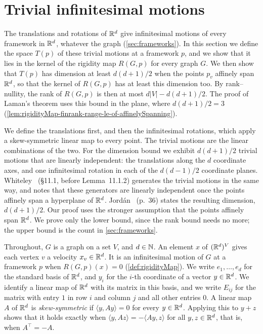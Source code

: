 \section{Trivial infinitesimal motions}
\label{sec:trivial-motions}

The translations and rotations of ${\mathbb{R}}^{d}$ give infinitesimal motions
of every framework in ${\mathbb{R}}^{d}$, whatever the graph
(\cref{sec:frameworks}). In this section we define the space $T(p)$ of
these trivial motions at a framework $p$, and we show that it lies in
the kernel of the rigidity map $R(G, p)$ for every graph $G$. We then
show that $T(p)$ has dimension at least $d(d+1)/2$ when the points
$p_v$ affinely span ${\mathbb{R}}^{d}$, so that the kernel of $R(G, p)$ has at
least this dimension too. By rank--nullity, the rank of $R(G, p)$ is
then at most $d|V| - d(d+1)/2$. The proof of Laman's theorem uses this
bound in the plane, where $d(d+1)/2 = 3$
(\cref{lem:rigidityMap-finrank-range-le-of-affinelySpanning}).

We define the translations first, and then the infinitesimal
rotations, which apply a skew-symmetric linear map to every point. The
trivial motions are the linear combinations of the two. For the
dimension bound we exhibit $d(d+1)/2$ trivial motions that are
linearly independent: the translations along the $d$ coordinate axes,
and one infinitesimal rotation in each of the $d(d-1)/2$ coordinate
planes. Whiteley~\cite{whiteley1996} (\S 11.1, before Lemma~11.1.2)
generates the trivial motions in the same way, and notes that these
generators are linearly independent once the points affinely span a
hyperplane of ${\mathbb{R}}^{d}$. Jord\'an~\cite{jordan2016} (p.~36) states the
resulting dimension, $d(d+1)/2$. Our proof uses the stronger
assumption that the points affinely span ${\mathbb{R}}^{d}$. We prove only the
lower bound, since the rank bound needs no more; the upper bound is
the count in \cref{sec:frameworks}.

Throughout, $G$ is a graph on a set $V$, and $d \in {\mathbb{N}}$. An element
$x$ of $({\mathbb{R}}^{d})^{V}$ gives each vertex $v$ a velocity
$x_v \in {\mathbb{R}}^{d}$. It is an infinitesimal motion of $G$ at a framework
$p$ when $R(G, p)(x) = 0$ (\cref{def:rigidityMap}). We write
$e_1, \dots, e_d$ for the standard basis of ${\mathbb{R}}^{d}$, and $y_i$ for
the $i$-th coordinate of a vector $y \in {\mathbb{R}}^{d}$. We identify a linear
map of ${\mathbb{R}}^{d}$ with its matrix in this basis, and we write $E_{ij}$
for the matrix with entry $1$ in row $i$ and column $j$ and all other
entries $0$. A linear map $A$ of ${\mathbb{R}}^{d}$ is \emph{skew-symmetric} if
$\langle y, A y \rangle = 0$ for every $y \in {\mathbb{R}}^{d}$. Applying this
to $y + z$ shows that it holds exactly when
$\langle y, A z \rangle = -\langle A y, z \rangle$ for all
$y, z \in {\mathbb{R}}^{d}$, that is, when $A^{\top} = -A$.

